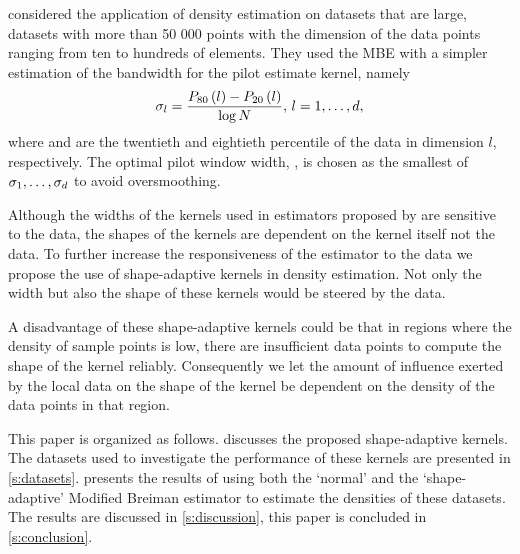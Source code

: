 	\textcite{ferdosi2011comparison} considered the application of density estimation on datasets that are large, \ie datasets with more than 50 000 points with the dimension of the data points ranging from ten to hundreds of elements. They used the MBE with a simpler estimation of the bandwidth for the pilot estimate kernel, namely 
		\begin{equation}
			\sigma_l = \frac{P_{80}\left( l \right) - P_{20}\left( l \right)}{\log N}, \, l = 1, \dotsc, d,
		\end{equation}
	where  and  are the twentieth and eightieth percentile of the data in dimension $l$, respectively. 
	The optimal pilot window width, \varBandwidth, is chosen as the smallest of $\sigma_1, \dotsc, \sigma_d$ to avoid oversmoothing.

	Although the widths of the kernels used in estimators proposed by \citeauthor{breiman1977variable,wilkinson1995dataplot} are sensitive to the data, the shapes of the kernels are dependent on the kernel itself not the data. To further increase the responsiveness of the estimator to the data we propose the use of shape-adaptive kernels in density estimation. Not only the width but also the shape of these kernels would be steered by the data. 

	A disadvantage of these shape-adaptive kernels could be that in regions where the density of sample points is low, there are insufficient data points to compute the shape of the kernel reliably. Consequently we let the amount of influence exerted by the local data on the shape of the kernel be dependent on the density of the data points in that region.

	This paper is organized as follows.  discusses the proposed shape-adaptive kernels. The datasets used to investigate the performance of these kernels are presented in \cref{s:datasets}.  presents the results of using both the `normal' and the `shape-adaptive' Modified Breiman estimator to estimate the densities of these datasets. The results are discussed in \cref{s:discussion}, this paper is concluded in \cref{s:conclusion}.